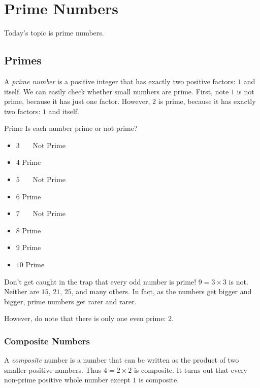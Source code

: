 \documentclass[a4paper,10pt]{report}
\begin{document}
\chapter{Prime Numbers}

Today's topic is prime numbers.

\section{Primes}
A \emph{prime number} is a positive integer that has exactly two positive
factors: $1$ and itself. We can easily check whether small numbers are prime.
First, note $1$ is not prime, because it has just one factor. However, $2$ is
prime, because it has exactly two factors: $1$ and itself.

\begin{problem}{Prime}
 Is each number prime or not prime?

 \begin{itemize}
  \item $3$ \hfill {}~~~Not Prime
  \item $4$ \hfill Prime~~~
  \item $5$ \hfill {}~~~Not Prime
  \item $6$ \hfill Prime~~~
  \item $7$ \hfill {}~~~Not Prime
  \item $8$ \hfill Prime~~~
  \item $9$ \hfill Prime~~~
  \item $10$ \hfill Prime~~~
 \end{itemize}
\end{problem}

Don't get caught in the trap that every odd number is prime! $9=3\times3$ is
not. Neither are $15$, $21$, $25$, and many others. In fact, as the numbers get
bigger and bigger, prime numbers get rarer and rarer.

However, do note that there is only one even prime: $2$.

\subsection{Composite Numbers}
A \emph{composite} number is a number that can be written as the product of two
smaller positive numbers. Thus $4=2\times2$ is composite. It turns out that
every non-prime positive whole number except $1$ is composite.
\end{document}
